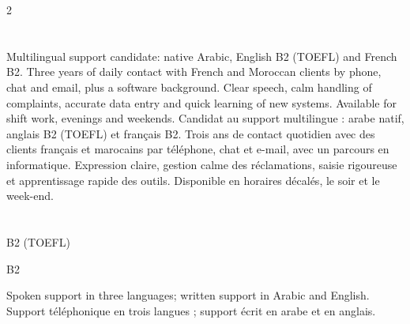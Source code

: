 \documentclass[10pt,a4paper]{article}
\begin{document}
\begin{paracol}{2}


\section*{}

{
Multilingual support candidate: native Arabic, English B2 (TOEFL) and French B2. Three years of daily contact with French and Moroccan clients by phone, chat and email, plus a software background. Clear speech, calm handling of complaints, accurate data entry and quick learning of new systems. Available for shift work, evenings and weekends.
}
{
Candidat au support multilingue : arabe natif, anglais B2 (TOEFL) et français B2. Trois ans de contact quotidien avec des clients français et marocains par téléphone, chat et e-mail, avec un parcours en informatique. Expression claire, gestion calme des réclamations, saisie rigoureuse et apprentissage rapide des outils. Disponible en horaires décalés, le soir et le week-end.
}


\section*{}

\textbf{} \hfill {}

\textbf{} \hfill B2 (TOEFL)

\textbf{} \hfill B2

\vspace{0.6em}

{Spoken support in three languages; written support in Arabic and English.}
{Support téléphonique en trois langues ; support écrit en arabe et en anglais.}


\section*{}


\end{paracol}
\end{document}
